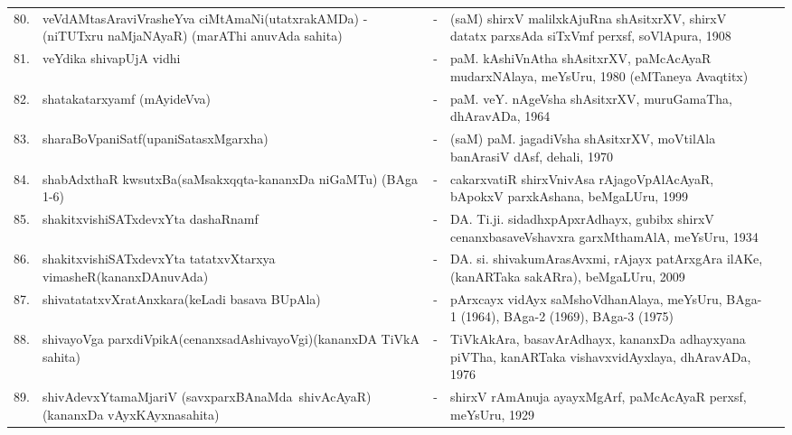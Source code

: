 {\begin{longtable}{lp{5cm}cp{5cm}<{\raggedright}p{3cm}<{\raggedright}@{}}
80. & veVdAMtasAraviVrasheYva ciMtAmaNi\newline (utatxrakAMDa) - (niTUTxru naMjaNAyaR) (marAThi anuvAda sahita) &-& (saM) shirxV malilxkAjuRna shAsitxrXV, shirxV datatx parxsAda siTxVmf perxsf, soVlApura, 1908\\
81. & veYdika shivapUjA vidhi &-& paM. kAshiVnAtha shAsitxrXV, paMcAcAyaR mudarxNAlaya, meYsUru, 1980 (eMTaneya Avaqtitx)\\
82. & shatakatarxyamf (mAyideVva) &-& paM. veY. nAgeVsha shAsitxrXV, muruGamaTha, dhAravADa, 1964\\
83. & sharaBoVpaniSatf\newline (upaniSatasxMgarxha) &-& (saM) paM. jagadiVsha shAsitxrXV, moVtilAla banArasiV dAsf, dehali, 1970\\
84. & shabAdxthaR kwsutxBa\newline (saMsakxqqta-kananxDa niGaMTu) (BAga 1-6) &-& cakarxvatiR shirxVnivAsa rAjagoVpAlAcAyaR, bApokxV parxkAshana, beMgaLUru, 1999\\
85. & shakitxvishiSATxdevxYta dashaRnamf &-& DA. Ti.ji. sidadhxpApxrAdhayx, gubibx shirxV cenanxbasaveVshavxra garxMthamAlA, meYsUru, 1934\\
86. & shakitxvishiSATxdevxYta tatatxvXtarxya vimasheR\newline (kananxDAnuvAda) &-& DA. si. shivakumArasAvxmi, rAjayx patArxgAra ilAKe, (kanARTaka sakARra), beMgaLUru, 2009\\
87. & shivatatatxvXratAnxkara\newline (keLadi basava BUpAla) &-& pArxcayx vidAyx saMshoVdhanAlaya, meYsUru, BAga-1 (1964), BAga-2 (1969), BAga-3 (1975)\\
88. & shivayoVga parxdiVpikA\newline (\hbox{cenanxsadAshiva\-yoVgi})\newline (kananxDA TiVkA sahita) &-& TiVkAkAra, basavArAdhayx, kananxDa adhayxyana piVTha, kanARTaka vishavxvidAyxlaya, dhAravADa, 1976\\
89. & shivAdevxYtamaMjariV \hbox{(savxparxBAnaMda shivAcAyaR)}\newline (kananxDa vAyxKAyxnasahita) &-& shirxV rAmAnuja ayayxMgArf, paMcAcAyaR perxsf, meYsUru, 1929\\

\end{longtable}}
